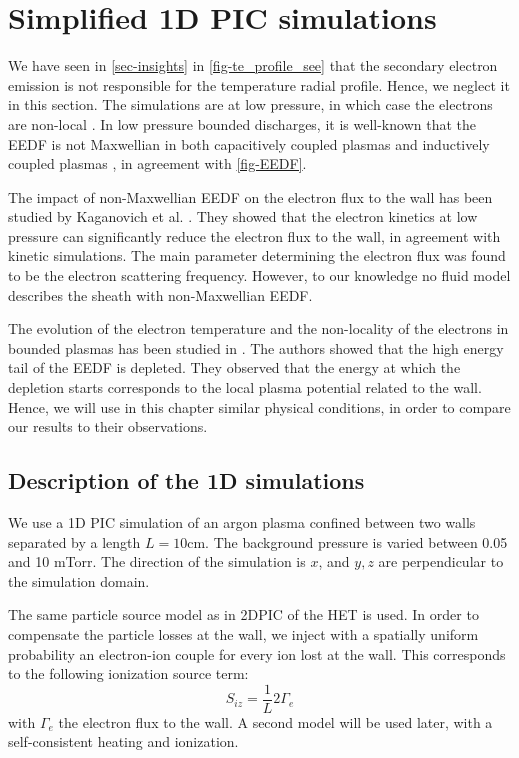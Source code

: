 
\section{Simplified 1D PIC simulations}
  \label{sec-1DPIC}

  We have seen in \cref{sec-insights} in \cref{fig-te_profile_see} that the secondary electron emission is not responsible for the temperature radial profile.
  Hence, we neglect it in this section.
  The simulations are at low pressure, in which case  the electrons are non-local \cite{bernstein1954, godyak1993}.
  In low pressure bounded discharges, it is well-known that the EEDF is not Maxwellian in both capacitively coupled plasmas and inductively coupled plasmas \cite{mouchtouris2016, godyak2002, meige2006a, dominguez-vazquez2018}, in agreement with \cref{fig-EEDF}.

  The impact of non-Maxwellian EEDF on the electron flux to the wall has been studied by Kaganovich et al. \citep{kaganovich2000,kaganovich2007}.
  They showed that the electron kinetics at low pressure can significantly reduce the electron flux to the wall, in agreement with kinetic simulations.
  The main parameter determining the electron flux was found to be the electron scattering frequency.
  However, to our knowledge no fluid model describes the sheath with non-Maxwellian EEDF.

  The evolution of the electron temperature and the non-locality of the electrons in bounded plasmas has been studied in \citet{meige2006a}.
  The authors showed that the high energy tail of the \ac{EEDF} is depleted.
  They observed that the energy at which the depletion starts corresponds to the local plasma potential related to the wall.
  Hence, we will use in this chapter similar physical conditions, in order to compare our results to their observations.

  \subsection{Description of the \acs{1D} simulations}

    We use a 1D PIC simulation of an argon plasma confined between two walls separated by a length $L=10$cm.
    The background pressure is varied between 0.05 and 10 mTorr.
    The direction of the simulation is $x$, and $y,z$ are perpendicular to the simulation domain.

    The same particle source model as in \ac{2D}\ac{PIC} of the \ac{HET} is used.
    In order to compensate the particle losses at the wall, we inject with a spatially uniform probability an electron-ion couple for every ion lost at the wall.
    This corresponds to the following ionization source term\string:
    \begin{equation}
      S_{iz} = \frac{1}{L} 2 \Gamma_e
    \end{equation}
    with $\Gamma_e$ the electron flux to the wall.
    A second model will be used later, with a self-consistent heating and ionization.

